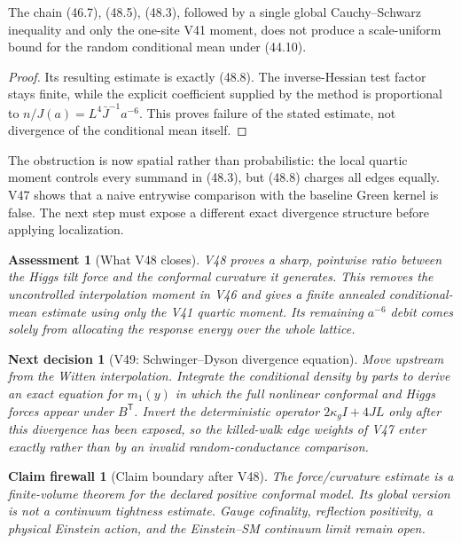 \documentclass[11pt]{article}
\newtheorem{firewall}[theorem]{Claim firewall}
\newtheorem{decision}[theorem]{Next decision}
\newtheorem{assessment}[theorem]{Assessment}
\theoremstyle{remark}
\begin{document}
\begin{countertheorem}
\label{ctr:v17v48-global}
The chain (46.7), (48.5), (48.3), followed by a single global
Cauchy--Schwarz inequality and only the one-site V41 moment, does not
produce a scale-uniform bound for the random conditional mean under
(44.10).
\end{countertheorem}

\begin{proof}
Its resulting estimate is exactly (48.8).  The inverse-Hessian test
factor stays finite, while the explicit coefficient supplied by the
method is proportional to \(n/J(a)=L^4\bar J^{-1}a^{-6}\).  This proves
failure of the stated estimate, not divergence of the conditional
mean itself.
\end{proof}

The obstruction is now spatial rather than probabilistic: the local
quartic moment controls every summand in (48.3), but (48.8) charges
all edges equally.  V47 shows that a naive entrywise comparison with
the baseline Green kernel is false.  The next step must expose a
different exact divergence structure before applying localization.

\begin{assessment}[What V48 closes]
\label{ass:v17v48-status}
V48 proves a sharp, pointwise ratio between the Higgs tilt force and
the conformal curvature it generates.  This removes the uncontrolled
interpolation moment in V46 and gives a finite annealed
conditional-mean estimate using only the V41 quartic moment.  Its
remaining \(a^{-6}\) debit comes solely from allocating the response
energy over the whole lattice.
\end{assessment}

\begin{decision}[V49: Schwinger--Dyson divergence equation]
\label{dec:v17v48-next}
Move upstream from the Witten interpolation.  Integrate the
conditional density by parts to derive an exact equation for
\(m_1(y)\) in which the full nonlinear conformal and Higgs forces
appear under \(B^{\mathsf T}\).  Invert the deterministic operator
\(2\kappa_gI+4JL\) only after this divergence has been exposed, so the
killed-walk edge weights of V47 enter exactly rather than by an invalid
random-conductance comparison.
\end{decision}

\begin{firewall}[Claim boundary after V48]
\label{fire:v17v48}
The force/curvature estimate is a finite-volume theorem for the
declared positive conformal model.  Its global version is not a
continuum tightness estimate.  Gauge cofinality, reflection
positivity, a physical Einstein action, and the Einstein--SM continuum
limit remain open.
\end{firewall}
\end{document}

